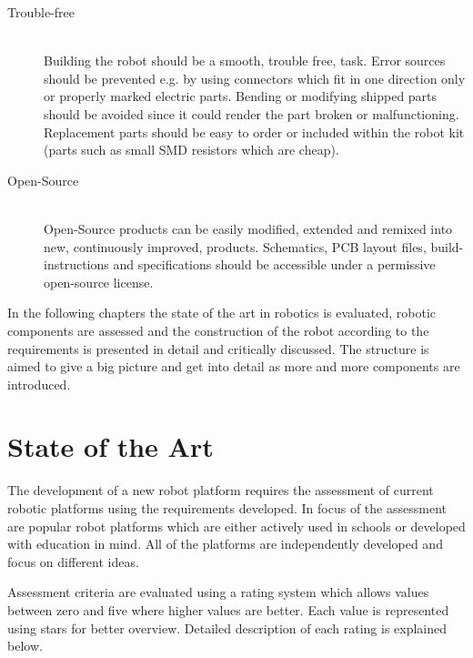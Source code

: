 \begin{description}
\item[Trouble-free] \hfill \\ Building the robot should be a smooth, trouble free, task. Error sources should be prevented e.g. by using connectors which fit in one direction only or properly marked electric parts. Bending or modifying shipped parts should be avoided since it  could render the part broken or malfunctioning. Replacement parts should be easy to order or included within the robot kit (parts such as small SMD resistors which are cheap).
\item[Open-Source] \hfill \\ Open-Source products can be easily modified, extended and remixed into new, continuously improved, products. Schematics, PCB layout files, build-instructions and specifications should be accessible under a permissive open-source license. 
\end{description}

In the following chapters the state of the art in robotics is evaluated, robotic components are assessed and the construction of the robot according to the requirements is presented in detail and critically discussed. The structure is aimed to give a big picture and get into detail as more and more components are introduced.
\chapter{State of the Art}
The development of a new robot platform requires the assessment of current robotic platforms using the requirements developed. In focus of the assessment are popular robot platforms which are either actively used in schools or developed with education in mind. All of the platforms are independently developed and focus on different ideas. 

Assessment criteria are evaluated using a rating system which allows values between zero and five where higher values are better. Each value is represented using stars for better overview. Detailed description of each rating is explained below.

